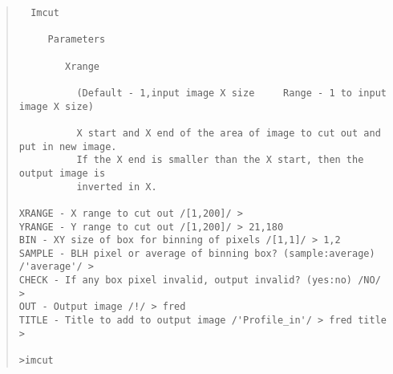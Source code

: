{\begin{quote}
\begin{tabbing}
\verb#  Imcut                                                      # \\
\verb#                                                             # \\
\verb#     Parameters                                              # \\
\verb#                                                             # \\
\verb#        Xrange                                               # \\
\verb#                                                             # \\
\verb#          (Default - 1,input image X size     Range - 1 to input image X size)  # \\
\verb#                                                             # \\
\verb#          X start and X end of the area of image to cut out and put in new image.     # \\
\verb#          If the X end is smaller than the X start, then the output image is # \\
\verb#          inverted in X.                                     # \\
\verb#                                                             # \\
\verb#XRANGE - X range to cut out /[1,200]/ >                                      # \\
\verb#YRANGE - Y range to cut out /[1,200]/ > 21,180                               # \\
\verb#BIN - XY size of box for binning of pixels /[1,1]/ > 1,2                     # \\
\verb#SAMPLE - BLH pixel or average of binning box? (sample:average) /'average'/ > # \\
\verb#CHECK - If any box pixel invalid, output invalid? (yes:no) /NO/ >            # \\
\verb#OUT - Output image /!/ > fred                                               # \\
\verb#TITLE - Title to add to output image /'Profile_in'/ > fred title            # \\
\verb#>                                                           #\\
\verb#                                                            #\\
\verb#>imcut                                                                      # \\

\end{tabbing}
\end{quote}}
